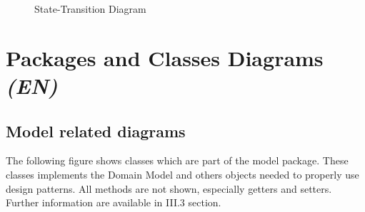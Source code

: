 \documentclass[paper=a4,fontsize=11pt]{report}
\numberwithin{equation}{section}		%
\numberwithin{figure}{section}		%
\numberwithin{table}{section}		%
\renewcommand{\it}[1]{\textit{#1}}
\begin{document}
\begin{figure}[H]
\noindent{}
\caption{State-Transition Diagram}
\end{figure}

\newpage

\section{Packages and Classes Diagrams \it{(EN)}}
\label{sec:packages-and-classes-diagrams}

\subsection{Model related diagrams}
\label{subsec:model-related-diagrams}

The following figure shows classes which are part of the model package. These classes implements the Domain Model and others objects needed to properly use design patterns. All methods are not shown, especially getters and setters. Further information are available in III.3 section.\\
\end{document}
